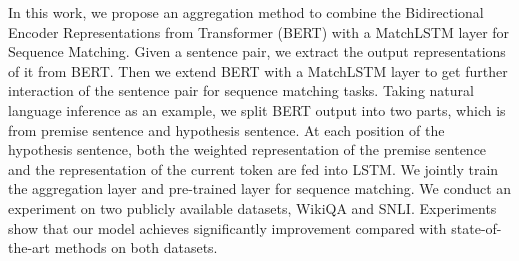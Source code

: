 In this work, we propose an aggregation method to combine the Bidirectional Encoder Representations from Transformer (BERT) with a MatchLSTM layer for Sequence Matching. Given a sentence pair, we extract the output representations of it from BERT. Then we extend BERT with a MatchLSTM layer to get further interaction of the sentence pair for sequence matching tasks. Taking natural language inference as an example,
we split BERT output into two parts, which is from premise sentence and hypothesis sentence. At each position of the hypothesis sentence, both the weighted representation of the premise sentence and the representation of the current token are fed into LSTM. We jointly train the aggregation layer and pre-trained layer for sequence matching. We conduct an experiment on two publicly available datasets, WikiQA and SNLI. Experiments show that our model achieves significantly improvement compared with state-of-the-art methods on both datasets.